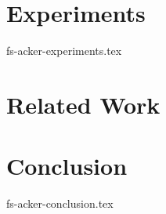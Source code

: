 \documentclass{vldb}
\begin{document}


\section {Experiments}
 {fs-acker-experiments.tex}

\section{Related Work}

\section {Conclusion}
 {fs-acker-conclusion.tex}


% 

\end{document}
